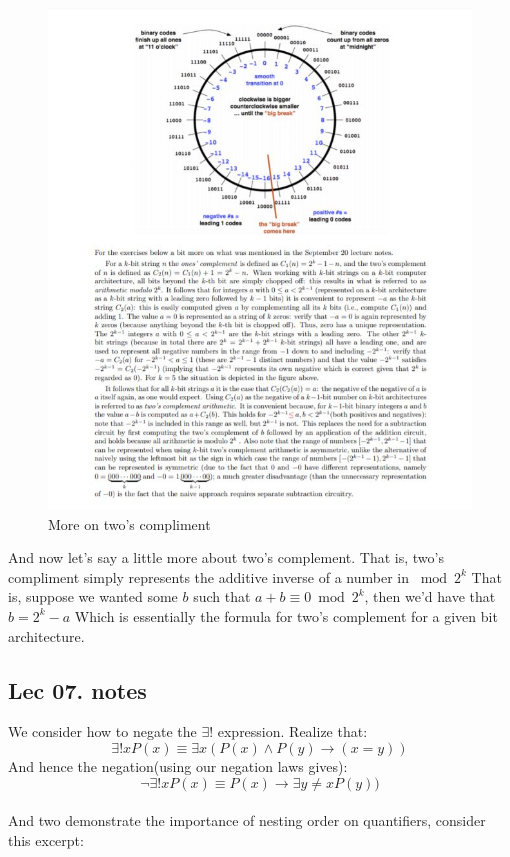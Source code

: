\documentclass{article}
\theoremstyle{definition}
\numberwithin{equation}{subsection}
\numberwithin{remark}{subsection}
\begin{document}
\begin{figure}[H]
    \centering
    \includegraphics[scale = 1.2]{epflSemesterOne/advancedComputation/figures/twosc.JPG}
    \caption{More on two's compliment}
    \label{fig:my_label}
\end{figure}

And now let's say a little more about two's complement. That is, two's compliment simply represents the additive inverse of a number in $\bmod{2^k}$ That is, suppose we wanted some $b$ such that $a + b \equiv 0 \bmod{2^k}$, then we'd have that $b = 2^{k} - a$ Which is essentially the formula for two's complement for a given bit architecture. 


\subsection{Lec 07. notes}

We consider how to negate the $\exists!$ expression. Realize that:
$$\exists!xP(x) \equiv \exists x(P(x)\land P(y) \rightarrow (x=y))$$
And hence the negation(using our negation laws gives):
$$\neg\exists ! xP(x) \equiv P(x) \rightarrow \exists y \not = xP(y))$$
\\
And two demonstrate the importance of nesting order on quantifiers, consider this excerpt:
\end{document}
